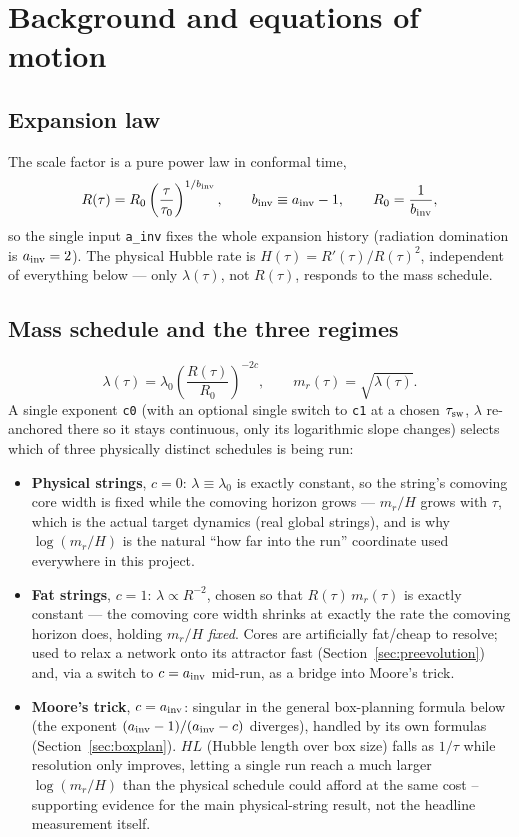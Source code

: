 \documentclass[11pt]{article}
\begin{document}
\section{Background and equations of motion}
\label{sec:eom}

\subsection{Expansion law}
The scale factor is a pure power law in conformal time,
\[
R(\tau) = R_0\left(\frac{\tau}{\tau_0}\right)^{1/b_{\rm inv}}, \qquad b_{\rm inv} \equiv a_{\rm inv}-1,
\qquad R_0 = \frac{1}{b_{\rm inv}},
\]
so the single input \texttt{a\_inv} fixes the whole expansion history (radiation domination is
$a_{\rm inv}=2$). The physical Hubble rate is $H(\tau) = R'(\tau)/R(\tau)^2$, independent of everything
below --- only $\lambda(\tau)$, not $R(\tau)$, responds to the mass schedule.

\subsection{Mass schedule and the three regimes}
\label{sec:regimes}
\[
\lambda(\tau) = \lambda_0\left(\frac{R(\tau)}{R_0}\right)^{-2c}, \qquad m_r(\tau) = \sqrt{\lambda(\tau)}.
\]
A single exponent \texttt{c0} (with an optional single switch to \texttt{c1} at a chosen $\tau_{\rm sw}$,
$\lambda$ re-anchored there so it stays continuous, only its logarithmic slope changes) selects which of
three physically distinct schedules is being run:
\begin{itemize}
  \item \textbf{Physical strings}, $c=0$: $\lambda\equiv\lambda_0$ is exactly constant, so the string's
        comoving core width is fixed while the comoving horizon grows --- $m_r/H$ grows with $\tau$, which
        is the actual target dynamics (real global strings), and is why $\log(m_r/H)$ is the natural
        ``how far into the run'' coordinate used everywhere in this project.
  \item \textbf{Fat strings}, $c=1$: $\lambda\propto R^{-2}$, chosen so that $R(\tau)\,m_r(\tau)$ is exactly
        constant --- the comoving core width shrinks at exactly the rate the comoving horizon does, holding
        $m_r/H$ \emph{fixed}. Cores are artificially fat/cheap to resolve; used to relax a network onto its
        attractor fast (Section~\ref{sec:preevolution}) and, via a switch to $c=a_{\rm inv}$ mid-run, as a
        bridge into Moore's trick.
  \item \textbf{Moore's trick}, $c=a_{\rm inv}$: singular in the general box-planning formula below (the
        exponent $(a_{\rm inv}-1)/(a_{\rm inv}-c)$ diverges), handled by its own formulas
        (Section~\ref{sec:boxplan}). $H\!L$ (Hubble length over box size) falls as $1/\tau$ while resolution
        only improves, letting a single run reach a much larger $\log(m_r/H)$ than the physical schedule
        could afford at the same cost -- supporting evidence for the main physical-string result, not the
        headline measurement itself.
\end{itemize}
\end{document}

